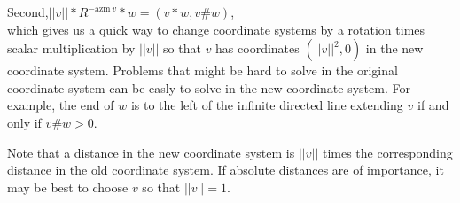 \documentclass[12pt]{article}
\begin{document}
Second,\hspace{0.5in}$||v||*R^{-\mathrm{azm}~v}*w=(v*w,v\#w)$,
\\[1ex]
which gives us a quick way to change coordinate systems
by a rotation times scalar multiplication by $||v||$ so that
$v$ has coordinates $(||v||^2,0)$ in the new coordinate system.
Problems that might be hard to solve in the original
coordinate system can be easly to solve in the new coordinate
system.  For example, the end of $w$ is to the left of the infinite directed
line extending $v$ if and only if $v\#w>0$.

Note that a distance in
the new coordinate system is $||v||$ times the corresponding
distance in the old coordinate system.  If absolute distances are
of importance, it may be best to choose $v$ so that $||v||=1$.

\bigskip
\end{document}
